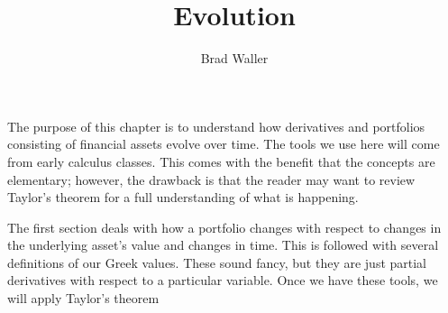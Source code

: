 \documentclass{ximera}
\title{Evolution}
\author{Brad Waller}
\begin{document}
\maketitle

The purpose of this chapter is to understand how derivatives and portfolios consisting of financial assets evolve over time. The tools we use here will come from early calculus classes. This comes with the benefit that the concepts are elementary; however, the drawback is that the reader may want to review Taylor's theorem for a full understanding of what is happening. 

The first section deals with how a portfolio changes with respect to changes in the underlying asset's value and changes in time. This is followed with several definitions of our Greek values. These sound fancy, but they are just partial derivatives with respect to a particular variable. Once we have these tools, we will apply Taylor's theorem
\end{document}
